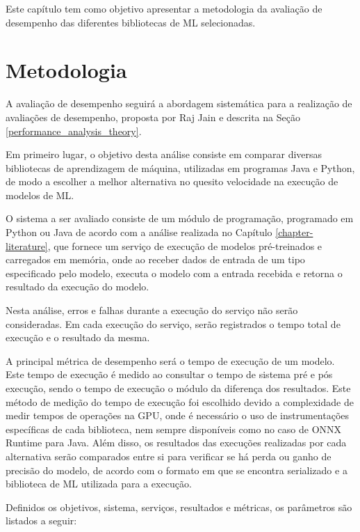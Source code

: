 Este capítulo tem como objetivo apresentar a metodologia da avaliação de desempenho das diferentes bibliotecas de ML selecionadas.

\section{Metodologia}

A avaliação de desempenho seguirá a abordagem sistemática para a realização de avaliações de desempenho, proposta por Raj Jain e descrita na Seção \ref{performance_analysis_theory}.

Em primeiro lugar, o objetivo desta análise consiste em comparar diversas bibliotecas de aprendizagem de máquina, utilizadas em programas Java e Python, de modo a escolher a melhor alternativa no quesito velocidade na execução de modelos de ML.

O sistema a ser avaliado consiste de um módulo de programação, programado em Python ou Java de acordo com a análise realizada no Capítulo \ref{chapter-literature}, que fornece um serviço de execução de modelos pré-treinados e carregados em memória, onde ao receber dados de entrada de um tipo especificado pelo modelo, executa o modelo com a entrada recebida e retorna o resultado da execução do modelo.

Nesta análise, erros e falhas durante a execução do serviço não serão consideradas. Em cada execução do serviço, serão registrados o tempo total de execução e o resultado da mesma.

A principal métrica de desempenho será o tempo de execução de um modelo. Este tempo de execução é medido ao consultar o tempo de sistema pré e pós execução, sendo o tempo de execução o módulo da diferença dos resultados. Este método de medição do tempo de execução foi escolhido devido a complexidade de medir tempos de operações na GPU, onde é necessário o uso de instrumentações específicas de cada biblioteca, nem sempre disponíveis como no caso de ONNX Runtime para Java. Além disso, os resultados das execuções realizadas por cada alternativa serão comparados entre si para verificar se há perda ou ganho de precisão do modelo, de acordo com o formato em que se encontra serializado e a biblioteca de ML utilizada para a execução.

Definidos os objetivos, sistema, serviços, resultados e métricas, os parâmetros são listados a seguir:

